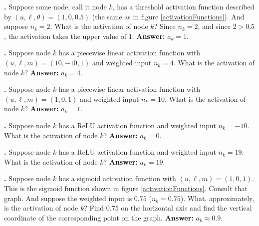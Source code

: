 \bigskip

\noindent
{\bf \theActFunctionCounter.} Suppose some node, call it node $k$, has a threshold
activation function described by $(u,\ell,\theta) = (1,0,0.5)$ (the same as in
figure \ref{activationFunctions}). And suppose $n_k = 2$. What is the activation
of node $k$?  Since $n_k = 2$, and since $2 > 0.5$, the activation takes the
upper value of $1$. {\bf Answer:} $a_k=1$.

\bigskip

%


\noindent
{\bf \theActFunctionCounter.} Suppose node $k$ has a piecewise linear activation function with $(u,\ell,m) = (10,-10,1)$ and weighted input $n_k = 4$. What is the activation of node $k$? {\bf
Answer:} $a_k = 4$.

\bigskip

\noindent
{\bf \theActFunctionCounter.} Suppose node $k$ has a piecewise linear activation function with $(u,\ell,m) = (1,0,1)$ and weighted input $n_k = 10$. What is the activation of node $k$? {\bf
Answer:} $a_k = 1$.

\bigskip

\noindent
{\bf \theActFunctionCounter.} Suppose node $k$ has a ReLU activation function and weighted input $n_k = -10$. What is the activation of node $k$? {\bf
Answer:} $a_k = 0$.

\bigskip


\noindent
{\bf \theActFunctionCounter.} Suppose node $k$ has a ReLU activation function and weighted input $n_k = 19$. What is the activation of node $k$? {\bf
Answer:} $a_k = 19$.

\bigskip

\label{actFunctEx3}
\noindent
{\bf \theActFunctionCounter.} Suppose node $k$ has a sigmoid activation function
with $(u,\ell,m) = (1,0,1)$. This is the sigmoid function shown in figure
\ref{activationFunctions}. Consult that graph. And suppose the weighted input is
$0.75$ ($n_k = 0.75$). What, approximately, is the activation of node $k$?
Find $0.75$ on the horizontal axis and find the vertical coordinate of the
corresponding point on the graph. {\bf Answer:} $a_k \approx 0.9$.


